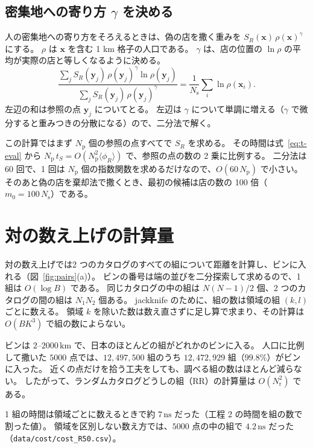 \documentclass[a4paper,11pt]{ltjsarticle}
\newcommand{\code}[1]{\texttt{#1}}
\begin{document}
\subsection{密集地への寄り方 $\gamma$ を決める}

人の密集地への寄り方をそろえるときは、偽の店を撒く重みを $S_R(\bm{x})\, \rho(\bm{x})^{\gamma}$ にする。
$\rho$ は $\bm{x}$ を含む 1 km 格子の人口である。
$\gamma$ は、店の位置の $\ln\rho$ の平均が実際の店と等しくなるように決める。
\begin{equation}
  \frac{\sum_j S_R(\bm{y}_j)\, \rho(\bm{y}_j)^{\gamma} \ln\rho(\bm{y}_j)}{\sum_j S_R(\bm{y}_j)\, \rho(\bm{y}_j)^{\gamma}}
  = \frac{1}{N_{\mathrm{s}}} \sum_i \ln\rho(\bm{x}_i).
  \label{eq:gamma}
\end{equation}
左辺の和は参照の点 $\bm{y}_j$ についてとる。
左辺は $\gamma$ について単調に増える（$\gamma$ で微分すると重みつきの分散になる）ので、二分法で解く。

この計算ではまず $N_{\mathrm{p}}$ 個の参照の点すべてで $S_R$ を求める。
その時間は式~\eqref{eq:t-eval} から $N_{\mathrm{p}}\, t_S = O(N_{\mathrm{p}}^2 \langle\phi_R\rangle)$ で、参照の点の数の 2 乗に比例する。
二分法は 60 回で、1 回は $N_{\mathrm{p}}$ 個の指数関数を求めるだけなので、$O(60\,N_{\mathrm{p}})$ で小さい。
そのあと偽の店を棄却法で撒くとき、最初の候補は店の数の 100 倍（$m_0 = 100\,N_{\mathrm{s}}$）である。

\section{対の数え上げの計算量}
\label{sec:pairs}

対の数え上げでは2 つのカタログのすべての組について距離を計算し、ビンに入れる（図~\ref{fig:pairs}(a)）。
ビンの番号は端の並びを二分探索して求めるので、1 組は $O(\log B)$ である。
同じカタログの中の組は $N(N-1)/2$ 個、2 つのカタログの間の組は $N_1 N_2$ 個ある。
jackknife のために、組の数は領域の組 $(k, l)$ ごとに数える。
領域 $k$ を除いた数は数え直さずに足し算で求まり、その計算は $O(B K^3)$ で組の数によらない。

ビンは $2$--$2000\,\mathrm{km}$ で、日本のほとんどの組がどれかのビンに入る。
人口に比例して撒いた $5000$ 点では、$12{,}497{,}500$ 組のうち $12{,}472{,}929$ 組（$99.8\%$）がビンに入った。
近くの点だけを拾う工夫をしても、調べる組の数はほとんど減らない。
したがって、ランダムカタログどうしの組（RR）の計算量は $O(N_{\mathrm{r}}^2)$ である。

1 組の時間は領域ごとに数えるときで約 $7\,\mathrm{ns}$ だった（工程 2 の時間を組の数で割った値）。
領域を区別しない数え方では、$5000$ 点の中の組で $4.2\,\mathrm{ns}$ だった（\code{data/cost/cost\_R50.csv}）。
\end{document}
